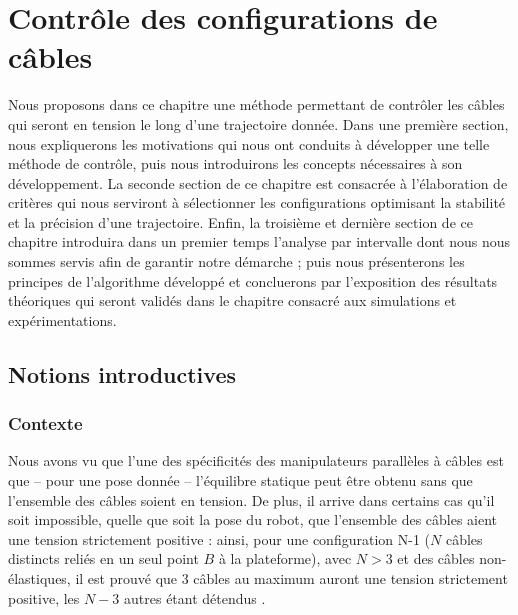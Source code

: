 \chapter{Contr\^ole des configurations de c\^ables}

Nous proposons dans ce chapitre une m\'ethode permettant de contr\^oler les
c\^ables qui seront en tension le long d'une trajectoire donn\'ee. Dans une
premi\`ere section, nous expliquerons les motivations qui nous ont
conduits \`a d\'evelopper une telle m\'ethode de contr\^ole, puis nous introduirons
les concepts n\'ecessaires \`a son d\'eveloppement. La seconde section de ce
chapitre est consacr\'ee \`a l'\'elaboration de crit\`eres qui nous serviront
\`a s\'electionner les configurations optimisant la stabilit\'e et la
pr\'ecision d'une trajectoire. Enfin, la troisi\`eme et derni\`ere section de
ce chapitre introduira dans un premier temps l'analyse par intervalle dont nous
nous sommes servis afin de garantir notre d\'emarche ; puis nous pr\'esenterons
les principes de l'algorithme d\'evelopp\'e et concluerons par l'exposition des
r\'esultats th\'eoriques qui seront valid\'es dans le chapitre consacr\'e aux
simulations et exp\'eri\-mentations.

\section{Notions introductives}

\subsection{Contexte}

Nous avons vu que l'une des sp\'ecificit\'es des manipulateurs parall\`eles \`a
c\^ables est que -- pour une pose donn\'ee -- l'\'equilibre statique peut
\^etre obtenu sans que l'ensemble des c\^ables soient en tension. De plus, il
arrive dans certains cas qu'il soit impossible, quelle que soit la pose du robot, que l'ensemble des c\^ables aient une tension strictement positive : ainsi,
pour une configuration N-1 ($N$ câbles distincts reliés en un seul point $B$ à la plateforme), avec $N> 3$ et des c\^ables non-\'elastiques, il
est prouv\'e que 3 c\^ables au maximum auront une tension strictement positive,
les $N-3$ autres \'etant d\'etendus \cite{merlet2012}.

